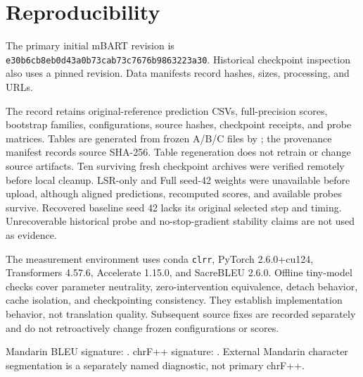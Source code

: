 \documentclass[11pt]{article}
\begin{document}
\section{Reproducibility}
\label{sec:reproducibility}
The primary initial mBART revision is \nolinkurl{e30b6cb8eb0d43a0b73cab73c7676b9863223a30}. Historical checkpoint inspection also uses a pinned revision. Data manifests record hashes, sizes, processing, and URLs.

The record retains original-reference prediction CSVs, full-precision scores, bootstrap families, configurations, source hashes, checkpoint receipts, and probe matrices. Tables are generated from frozen A/B/C files by ; the provenance manifest records source SHA-256. Table regeneration does not retrain or change source artifacts. Ten surviving fresh checkpoint archives were verified remotely before local cleanup. LSR-only and Full seed-42 weights were unavailable before upload, although aligned predictions, recomputed scores, and available probes survive. Recovered baseline seed 42 lacks its original selected step and timing. Unrecoverable historical probe and no-stop-gradient stability claims are not used as evidence.

The measurement environment uses conda \texttt{clrr}, PyTorch 2.6.0+cu124, Transformers 4.57.6, Accelerate 1.15.0, and SacreBLEU 2.6.0. Offline tiny-model checks cover parameter neutrality, zero-intervention equivalence, detach behavior, cache isolation, and checkpointing consistency. They establish implementation behavior, not translation quality. Subsequent source fixes are recorded separately and do not retroactively change frozen configurations or scores.

Mandarin BLEU signature: . chrF++ signature: . External Mandarin character segmentation is a separately named diagnostic, not primary chrF++.
\end{document}
